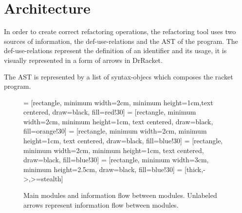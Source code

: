 \section{Architecture}



In order to create correct refactoring operations, the refactoring tool uses two sources of
information, the def-use-relations and the AST of the program.
The def-use-relations represent the definition of an identifier and its usage, it is
 visually represented in a form of arrows in DrRacket.

The AST is represented by a list of syntax-objecs which composes the racket program.


\begin{figure}
\centering
{} = [rectangle,  minimum width=2cm, minimum height=1cm,text centered, draw=black, fill=red!30] %
 = [rectangle,  minimum width=2cm, minimum height=1cm, text centered, draw=black, fill=orange!30] %
 = [rectangle,  minimum width=2cm, minimum height=1cm, text centered, draw=black, fill=blue!30]
 = [rectangle,  minimum width=2cm, minimum height=1cm, text centered, draw=black, fill=blue!30]
 = [rectangle,  minimum width=3cm, minimum height=2.5cm, draw=black, fill=blue!30]
 = [thick,->,>=stealth]
\caption{Main modules and information flow between modules. Unlabeled arrows represent information
flow between modules.}
\label{flow-chart}
\end{figure}

